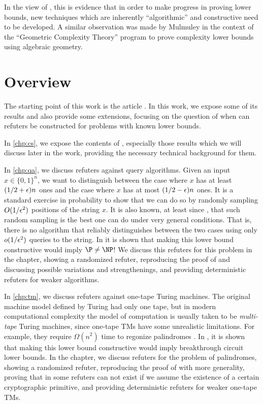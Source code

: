 In the view of \cite{ConstructiveSeparations}, this is evidence that in order to make progress
in proving lower bounds, new techniques which are inherently ``algorithmic'' 
and constructive need to be developed. A similar observation was made by Mulmuley 
\cite{Mulmuley10} in the context of the ``Geometric Complexity Theory'' program 
to prove complexity lower bounds using algebraic geometry. 

\section{Overview}

The starting point of this work is the article \cite{ConstructiveSeparations}. In this work,
we expose some of its results and also provide some extensions, focusing on the question of
when can refuters be constructed for problems with known lower bounds.

In \cref{chp:cs}, we expose the contents of \cite{ConstructiveSeparations}, especially those
results which we will discuss later in the work, providing the necessary technical background 
for them. 

In \cref{chp:qa}, we discuss refuters against query algorithms. 
Given an input $x \in \{0, 1\}^n$, we want to distinguish between the case where $x$ has at
least $(1/2 + \epsilon)n$ ones and the case where $x$ has at most $(1/2 - \epsilon)n$ ones. 
It is a standard exercise in probability to show that we can do so by randomly sampling $O(1/\epsilon^2)$
positions of the string $x$. It is also known, at least since \cite{Canetti95}, that such
random sampling is the best one can do under very general conditions. That is, there is no
algorithm that reliably distinguishes between the two cases using only $o(1/\epsilon^2)$ queries
to the string. In \cite{ConstructiveSeparations} it is shown that making this lower bound
constructive would imply $\P \neq \NP$! We discuss this refuters for this
problem in the chapter, showing a 
randomized refuter, reproducing the proof of \cite{ConstructiveSeparations} and discussing
possible variations and strengthenings, and providing deterministic refuters for weaker algorithms. 

In \cref{chp:tm}, we discuss refuters against one-tape Turing machines. 
The original machine model defined by Turing \cite{Turing36} had only one tape, 
but in modern computational complexity the model of computation is usually taken
to be \emph{multi-tape} Turing machines, since one-tape TMs have some 
unrealistic limitations.
For example, they require $\Omega(n^2)$ time to regonize palindromes \cite{Hennie65}. 
In \cite{ConstructiveSeparations}, it is shown that making this lower bound constructive
would imply breakthrough circuit lower bounds. In the chapter, we discuss refuters
for the problem of palindromes, showing a randomized refuter, reproducing the proof of 
\cite{ConstructiveSeparations} with more generality, proving that in some refuters 
can not exist if we assume the existence of a certain cryptographic primitive, 
and providing deterministic refuters for weaker one-tape TMs. 



